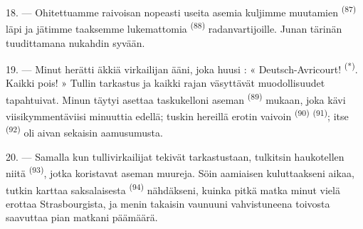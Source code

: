 18. --- Ohitettuamme raivoisan nopeasti useita asemia kuljimme muutamien
 \textsuperscript{(87)} läpi ja jätimme taaksemme
lukemattomia  \textsuperscript{(88)} radanvartijoille.
Junan tärinän tuudittamana nukahdin syvään.

\VUsaut{3.0mm}
\VUsaut{3.0mm}

19. --- Minut herätti äkkiä virkailijan ääni, joka huusi :
« Deutsch-Avricourt! \textsuperscript{(*)}. Kaikki pois! » Tullin tarkastus ja
kaikki rajan väsyttävät muodollisuudet tapahtuivat. Minun täytyi asettaa
taskukelloni aseman  \textsuperscript{(89)} mukaan, joka
kävi viisikymmentäviisi minuuttia edellä; tuskin hereillä erotin vaivoin
 \textsuperscript{(90)} 
\textsuperscript{(91)}; itse  \textsuperscript{(92)} oli
aivan sekaisin aamusumusta.

20. --- Samalla kun tullivirkailijat tekivät tarkastustaan, tulkitsin haukotellen
niitä  \textsuperscript{(93)}, jotka koristavat aseman
muureja. Söin aamiaisen kuluttaakseni aikaa, tutkin karttaa saksalaisesta
 \textsuperscript{(94)} nähdäkseni, kuinka pitkä matka minut
vielä erottaa Strasbourgista, ja menin takaisin vaunuuni vahvistuneena
toivosta saavuttaa pian matkani päämäärä.
\VUsaut{6.0mm}
\VUfilet{22mm}
